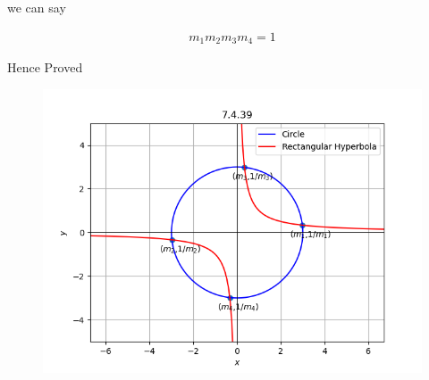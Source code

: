 \documentclass[journal]{IEEEtran}
\numberwithin{equation}{enumi}
\numberwithin{figure}{enumi}
\begin{document}
we can say 

\begin{align}
    m_1m_2m_3m_4 = 1 
\end{align}

Hence Proved

\begin{figure}[H]
    \centering
    \includegraphics[width=1.0\columnwidth]{figs/graph1.png}
    \caption*{}
    \label{fig:placeholder}
\end{figure}
\end{document}
